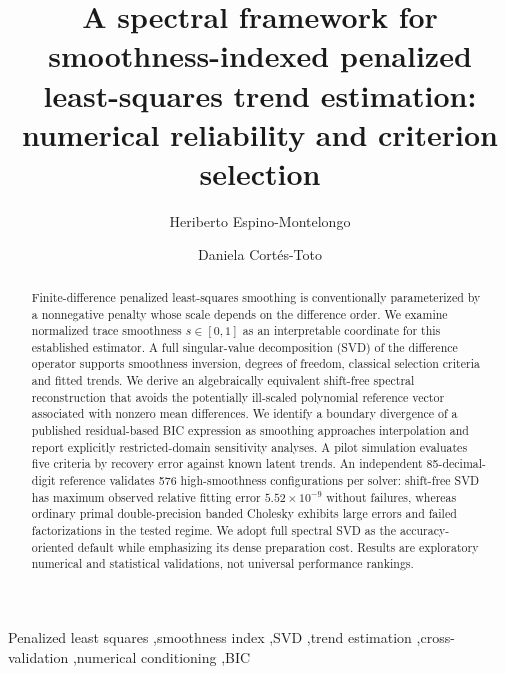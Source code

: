 \documentclass[a4paper,fleqn]{cas-dc}
\begin{document}
\let\WriteBookmarks\relax
\def\floatpagepagefraction{1}
\def\textpagefraction{.001}
\title[mode=title]{A spectral framework for smoothness-indexed penalized least-squares trend estimation: numerical reliability and criterion selection}
\author[1]{Heriberto Espino-Montelongo}
\author[1]{Daniela Cort\'es-Toto}
\begin{abstract}
Finite-difference penalized least-squares smoothing is conventionally parameterized by a nonnegative penalty whose scale depends on the difference order. We examine normalized trace smoothness $s\in[0,1]$ as an interpretable coordinate for this established estimator. A full singular-value decomposition (SVD) of the difference operator supports smoothness inversion, degrees of freedom, classical selection criteria and fitted trends. We derive an algebraically equivalent shift-free spectral reconstruction that avoids the potentially ill-scaled polynomial reference vector associated with nonzero mean differences. We identify a boundary divergence of a published residual-based BIC expression as smoothing approaches interpolation and report explicitly restricted-domain sensitivity analyses. A pilot simulation evaluates five criteria by recovery error against known latent trends. An independent 85-decimal-digit reference validates 576 high-smoothness configurations per solver: shift-free SVD has maximum observed relative fitting error $5.52\times10^{-9}$ without failures, whereas ordinary primal double-precision banded Cholesky exhibits large errors and failed factorizations in the tested regime. We adopt full spectral SVD as the accuracy-oriented default while emphasizing its dense preparation cost. Results are exploratory numerical and statistical validations, not universal performance rankings.
\end{abstract}
\begin{keywords}
Penalized least squares \sep smoothness index \sep SVD \sep trend estimation \sep cross-validation \sep numerical conditioning \sep BIC
\end{keywords}
\maketitle








\end{document}
